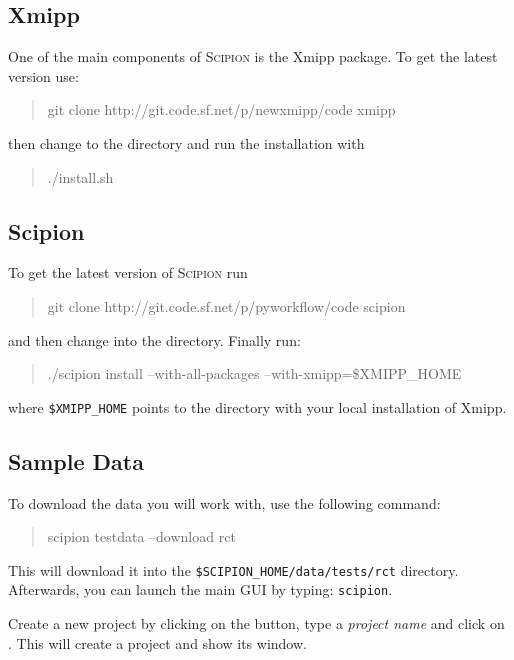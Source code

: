 \documentclass[12pt]{article} %
\newcommand{\scipion}{\textsc{Scipion} }
\newenvironment{command}{\tt\begin{quote}}{\end{quote}}
\begin{document}
\subsection{Xmipp}

One of the main components of \scipion is the Xmipp package. To get
the latest version use:

\begin{command}
git clone http://git.code.sf.net/p/newxmipp/code xmipp
\end{command}

\noindent
then change to the  directory and run the installation with

\begin{command}
./install.sh
\end{command}

\subsection{Scipion}

To get the latest version of \scipion run

\begin{command}
git clone http://git.code.sf.net/p/pyworkflow/code scipion
\end{command}

\noindent
and then change into the  directory. Finally run:

\begin{command}
./scipion install --with-all-packages --with-xmipp=\$XMIPP\_HOME
\end{command}

\noindent
where \verb+$XMIPP_HOME+ points to the directory with your local
installation of Xmipp.

\subsection{Sample Data}

To download the data you will work with, use the following command:

\begin{command}
scipion testdata --download rct
\end{command}

This will download it into the \verb+$SCIPION_HOME/data/tests/rct+
directory. Afterwards, you can launch the main GUI by typing:
\verb+scipion+.

Create a new project by clicking on the  button,
type a \textit{project name} and click on . This will create
a project and show its window.
\end{document}
